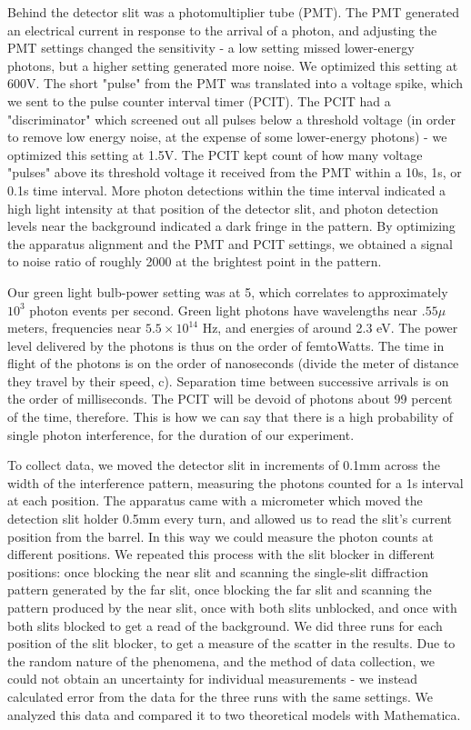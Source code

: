 \documentclass[prb,preprint]{revtex4-1}
\begin{document}
Behind the detector slit was a photomultiplier tube (PMT).  The PMT generated an electrical current in response to the arrival of a photon, and adjusting the PMT settings changed the sensitivity - a low setting missed lower-energy photons, but a higher setting generated more noise.  We optimized this setting at 600V.  The short "pulse" from the PMT was translated into a voltage spike, which we sent to the pulse counter interval timer (PCIT).  The PCIT had a "discriminator" which screened out all pulses below a threshold voltage (in order to remove low energy noise, at the expense of some lower-energy photons) - we optimized this setting at 1.5V. The PCIT kept count of how many voltage "pulses" above its threshold voltage it received from the PMT within a 10s, 1s, or 0.1s time interval. More photon detections within the time interval indicated a high light intensity at that position of the detector slit, and photon detection levels near the background indicated a dark fringe in the pattern. By optimizing the apparatus alignment and the PMT and PCIT settings, we obtained a signal to noise ratio of roughly 2000 at the brightest point in the pattern.  

Our green light bulb-power setting was at 5, which correlates to approximately $10^{3}$ photon events per second.  Green light photons have wavelengths near $.55 \mu $ meters, frequencies near $5.5 \times 10^{14} $ Hz, and energies of around 2.3 eV.  The power level delivered by the photons is thus on the order of femtoWatts.  The time in flight of the photons is on the order of nanoseconds (divide the meter of distance they travel by their speed, c).  Separation time between successive arrivals is on the order of milliseconds.  The PCIT will be devoid of photons about 99 percent of the time, therefore.  This is how we can say that there is a high probability of single photon interference, for the duration of our experiment.

To collect data, we moved the detector slit in increments of 0.1mm across the width of the interference pattern, measuring the photons counted for a 1s interval at each position.  The apparatus came with a micrometer which moved the detection slit holder 0.5mm every turn, and allowed us to read the slit's current position from the barrel.  In this way we could measure the photon counts at different positions.  We repeated this process with the slit blocker in different positions: once blocking the near slit and scanning the single-slit diffraction pattern generated by the far slit, once blocking the far slit and scanning the pattern produced by the near slit, once with both slits unblocked, and once with both slits blocked to get a read of the background.  We did three runs for each position of the slit blocker, to get a measure of the scatter in the results.  Due to the random nature of the phenomena, and the method of data collection, we could not obtain an uncertainty for individual measurements - we instead calculated error from the data for the three runs with the same settings.  We analyzed this data and compared it to two theoretical models with Mathematica.  
\end{document}
